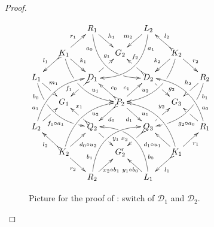 \documentclass[a4paper,UKenglish,cleveref,pdftex,thm-restate,numberwithinsect]{lipics-v2021}
\newcommand{\dder}[1]{\mathscr{#1}}
\begin{document}
\begin{proof}
	
	\begin{figure}[t]
		\centering 
		$\xymatrix@C=15pt@R=15pt{&&R_1 \ar@/_.8cm/[ddrr]_(.2){a_0}|(.7)\hole
			\ar[dr]^{h_1}&& L_2\ar@/^.8cm/[ddll]^(.2){a_1}
			\ar[dl]_{m_2}\\&K_1\ar[dr]^{k_1}\ar@{>->}[dl]_{l_1}
			\ar@/_.6cm/[ddrr]|(.36)\hole^(.65){u_1}\ar[ur]^{r_1}&& G_2 &&
			K_2
			\ar@/^.6cm/[ddll]|(.36)\hole_(.65){u_2}\ar[dl]_{k_2}\ar@{>->}[lu]_{l_2}
			\ar[dr]^{r_2}\\L_1
			\ar@/_.6cm/[ddrr]_(.2){b_0}|(.31)\hole|(.81)\hole
			\ar[dr]^(.4){m_1}|(.61)\hole && D_1
			\ar@{>->}[dl]|(.4)\hole_(.65){f_1}\ar[ur]|(.5)\hole^(.7){g_1}&&D_2
			\ar[dr]|(.4)\hole^(.65){g_2}
			\ar@{>->}[ul]|(.5)\hole_(.65){f_2}&&R_2\ar@/^.6cm/[ddll]^(.2){b_1}|(.31)\hole|(.81)\hole\ar[dl]_(.4){h_2}|(.61)\hole\\&G_1
			&&P_2\ar[dr]_{d_1}
			\ar@{>->}[dl]^{d_0}\ar[ur]^(.4){c_1}\ar@{>->}[ul]_(.4){c_0}&&G_3\\L_2
			\ar@/^.6cm/[uurr]^(.2){a_1} \ar[ur]_(.35){f_1\circ
				a_1}|(.61)\hole&&Q_2
			\ar@{>->}[ul]|(.4)\hole_(.65){x_1}\ar[dr]|(.5)\hole^(.65){y_1}
			&&Q_3\ar[ur]|(.4)\hole^(.65){y_2} \ar@{>->}[dl]|(.5)\hole_(.65){x_2}
			&& R_1 \ar[ul]^(.3){g_2\circ
				a_0}|(.61)\hole\ar@/_.6cm/[uull]_(.2){a_0}\\&K_2
			\ar[ur]_{d_0\circ u_2} \ar[dr]_{r_2}
			\ar@{>->}[ul]^{l_2}\ar@/^.6cm/[uurr]_(.65){u_2}&&G'_2&& K_1
			\ar[ur]_{r_1} \ar[ul]^{d_1\circ u_1} \ar@{>->}[dl]^{l_1}
			\ar@/_.6cm/[uull]^(.65){u_1}\\&& R_2
			\ar[ur]_{\hspace{-6pt}x_2\circ
				b_1}\ar@/^.8cm/[uurr]^(.2){b_1}&& L_1 \ar[ul]^{y_1\circ
				b_0\hspace{-7pt}} \ar@/_.8cm/[uull]_(.2){b_0} |(.69)\hole
		}	$		
		\caption{Picture for the proof of : switch of $\dder{D}_1$ and $\dder{D}_2$.}
		\label{fi:second}
	\end{figure}
	

\end{proof}
\end{document}
